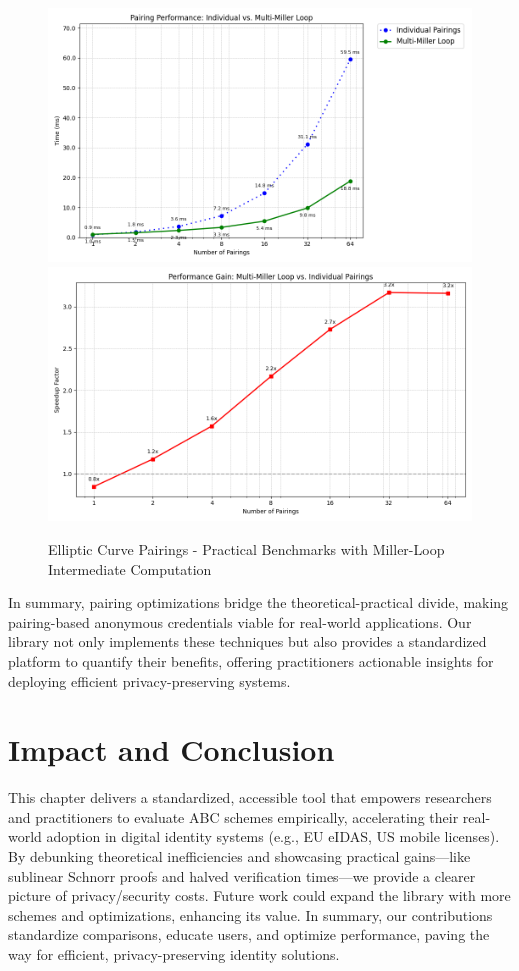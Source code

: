 \begin{figure}[!htb]
    \centering
    \includegraphics[width=0.75\linewidth]{pairing_comparison.png}
    \includegraphics[width=0.75\linewidth]{pairing_comparison2.png}
    \caption{Elliptic Curve Pairings - Practical Benchmarks with Miller-Loop Intermediate Computation}
    \label{fig:elliptic_curve_pairings_speedup}
\end{figure}

In summary, pairing optimizations bridge the theoretical-practical divide, making pairing-based anonymous credentials viable for real-world applications. Our library not only implements these techniques but also provides a standardized platform to quantify their benefits, offering practitioners actionable insights for deploying efficient privacy-preserving systems.



\section{Impact and Conclusion}
This chapter delivers a standardized, accessible tool that empowers researchers and practitioners to evaluate ABC schemes empirically, accelerating their real-world adoption in digital identity systems (e.g., EU eIDAS, US mobile licenses). By debunking theoretical inefficiencies and showcasing practical gains—like sublinear Schnorr proofs and halved verification times—we provide a clearer picture of privacy/security costs. Future work could expand the library with more schemes and optimizations, enhancing its value. In summary, our contributions standardize comparisons, educate users, and optimize performance, paving the way for efficient, privacy-preserving identity solutions.






